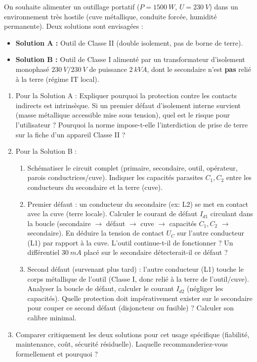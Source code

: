 \documentclass[11pt]{article}
\begin{document}
\begin{exercice}
On souhaite alimenter un outillage portatif ($P=\SI{1500}{W}$, $U=\SI{230}{V}$) dans un environnement très hostile (cuve métallique, conduite forcée, humidité permanente). Deux solutions sont envisagées : 
\begin{itemize}
    \item \textbf{Solution A :} Outil de Classe II (double isolement, pas de borne de terre).
    \item \textbf{Solution B :} Outil de Classe I alimenté par un transformateur d'isolement monophasé $\SI{230}{V}/\SI{230}{V}$ de puissance $\SI{2}{kV A}$, dont le secondaire n'est \textbf{pas} relié à la terre (régime IT local).
\end{itemize}
\begin{enumerate}
    \item Pour la Solution A : Expliquer pourquoi la protection contre les contacts indirects est intrinsèque. Si un premier défaut d'isolement interne survient (masse métallique accessible mise sous tension), quel est le risque pour l'utilisateur ? Pourquoi la norme impose-t-elle l'interdiction de prise de terre sur la fiche d'un appareil Classe II ?
    \item Pour la Solution B : 
    \begin{enumerate}
        \item Schématiser le circuit complet (primaire, secondaire, outil, opérateur, parois conductrices/cuve). Indiquer les capacités parasites $C_1, C_2$ entre les conducteurs du secondaire et la terre (cuve).
        \item Premier défaut : un conducteur du secondaire (ex: L2) se met en contact avec la cuve (terre locale). Calculer le courant de défaut $I_{d1}$ circulant dans la boucle (secondaire $\to$ défaut $\to$ cuve $\to$ capacités $C_1, C_2$ $\to$ secondaire). En déduire la tension de contact $U_C$ sur l'autre conducteur (L1) par rapport à la cuve. L'outil continue-t-il de fonctionner ? Un différentiel $\SI{30}{mA}$ placé sur le secondaire détecterait-il ce défaut ?
        \item Second défaut (survenant plus tard) : l'autre conducteur (L1) touche le corps métallique de l'outil (Classe I, donc relié à la terre de l'outil/cuve). Analyser la boucle de défaut, calculer le courant $I_{d2}$ (négliger les capacités). Quelle protection doit impérativement exister sur le secondaire pour couper ce second défaut (disjoncteur ou fusible) ? Calculer son calibre minimal.
    \end{enumerate}
    \item Comparer critiquement les deux solutions pour cet usage spécifique (fiabilité, maintenance, coût, sécurité résiduelle). Laquelle recommanderiez-vous formellement et pourquoi ?
\end{enumerate}
\end{exercice}
\end{document}
